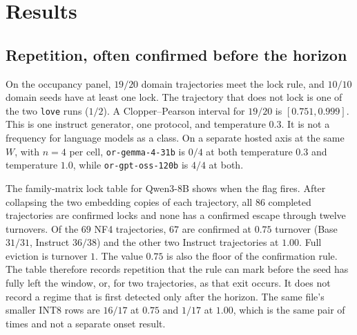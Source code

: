 \documentclass[10pt]{article}
\begin{document}
\section{Results}
\label{sec:results}

\subsection{Repetition, often confirmed before the horizon}
\label{sec:repetition}

On the occupancy panel, $19/20$ domain trajectories meet the lock rule,
and $10/10$ domain seeds have at least one lock. %
The trajectory that does not lock is one of the two \texttt{love} runs
($1/2$). %
A Clopper--Pearson interval for $19/20$ is $[0.751, 0.999]$. %
This is one instruct generator, one protocol, and temperature $0.3$. %
It is not a frequency for language models as a class.
On a separate hosted axis at the same $W$, with $n{=}4$ per cell,
\texttt{or-gemma-4-31b} is $0/4$ at both temperature $0.3$ and
temperature $1.0$, while \texttt{or-gpt-oss-120b} is $4/4$ at both. %

The family-matrix lock table for Qwen3-8B shows when the flag fires.
After collapsing the two embedding copies of each trajectory, all $86$
completed trajectories are confirmed locks and none has a confirmed
escape through twelve turnovers. %
Of the $69$ NF4 trajectories, $67$ are confirmed at $0.75$ turnover
(Base $31/31$, Instruct $36/38$) and the other two Instruct
trajectories at $1.00$. %
Full eviction is turnover $1$.
The value $0.75$ is also the floor of the confirmation rule.
The table therefore records repetition that the rule can mark before
the seed has fully left the window, or, for two trajectories, as that
exit occurs.
It does not record a regime that is first detected only after the
horizon.
The same file's smaller INT8 rows are $16/17$ at $0.75$ and $1/17$ at
$1.00$, which is the same pair of times and not a separate onset
result. %
\end{document}
